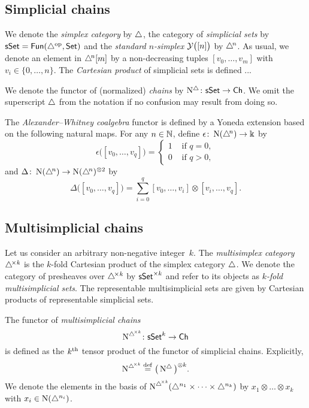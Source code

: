 \subsection{Simplicial chains}

We denote the \textit{simplex category} by $\triangle$, the category of \textit{simplicial sets} by $\mathsf{sSet} = \mathsf{Fun}(\triangle^{\mathrm{op}}, \mathsf{Set})$ and the \textit{standard $n$-simplex} $\mathcal{Y}\big([n]\big)$ by $\triangle^{\!n}$.
As usual, we denote an element in $\triangle^{\!n}[m]$ by a non-decreasing tuples $[v_0, \dots, v_m]$ with $v_i \in \{0, \dots, n\}$.
The \textit{Cartesian product} of simplicial sets is defined ...

We denote the functor of (normalized) \textit{chains} by $\operatorname{N^{\triangle}} \colon \mathsf{sSet} \to \mathsf{Ch}$.
We omit the superscript $\triangle$ from the notation if no confusion may result from doing so.

The \textit{Alexander--Whitney coalgebra} functor is defined by a Yoneda extension based on the following natural maps.
For any $n \in \mathbb{N}$, define $\epsilon \colon \operatorname{N}(\triangle^{\!n}) \to \Bbbk$ by
\[
\epsilon \big( [v_0, \dots, v_q] \big) = \begin{cases} 1 & \text{ if } q = 0, \\ 0 & \text{ if } q>0, \end{cases}
\]
and $\Delta \colon \operatorname{N}(\triangle^{\!n}) \to \operatorname{N}(\triangle^{\!n})^{\otimes2}$ by
\[
\Delta \big( [v_0, \dots, v_q] \big) = \sum_{i=0}^q [v_0, \dots, v_i] \otimes [v_i, \dots, v_q].
\]

\subsection{Multisimplicial chains}

Let us consider an arbitrary non-negative integer~$k$.
The \textit{multisimplex category} $\triangle^{\!\times\mathit{k}}$ is the $k$-fold Cartesian product of the simplex category $\triangle$.
We denote the category of presheaves over $\triangle^{\!\times\mathit{k}}$ by $\mathsf{sSet}^{\times k}$ and refer to its objects as \textit{$k$-fold multisimplicial sets}.
The representable multisimplicial sets are given by Cartesian products of representable simplicial sets.

The functor of \textit{multisimplicial chains}
\[
\operatorname{\operatorname{N}^{\triangle^{\!\times\mathit{k}}}} \colon \mathsf{sSet}^k \to \mathsf{Ch}
\]
is defined as the $k^{\mathrm{th}}$ tensor product of the functor of simplicial chains.
Explicitly,
\[
\operatorname{\operatorname{N}^{\triangle^{\!\times\mathit{k}}}} \stackrel{\mathrm{def}}{=} \big( \operatorname{N^{\triangle}} \big)^{\otimes k}.
\]
We denote the elements in the basis of $\operatorname{\operatorname{N}^{\triangle^{\!\times\mathit{k}}}}(\triangle^{n_1} \times \dots \times \triangle^{n_k})$ by $x_1 \otimes \dots \otimes x_k$ with $x_i \in \operatorname{N}(\triangle^{n_i})$.

